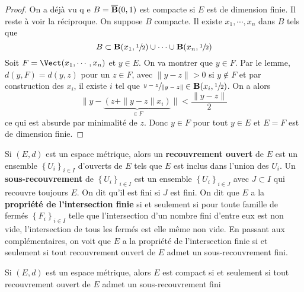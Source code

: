 \begin{proof}
    On a déjà vu q e $B= \overline{\mathbf B}(0, 1)$ est compacte si $E$ est de dimension finie. Il reste à voir la réciproque. On suppose $B$ compacte. Il existe $x_1, \cdots , x_n$ dans $B$ tels que \[
        B\subset \mathbf B(x_1, \sfrac12)\cup \cdots \cup \mathbf B(x_n, \sfrac 12)
    \] 
    Soit $F=\Vect(x_1, \cdots , x_n)$ et $y \in  E$. On va montrer que $y \in F$. Par le lemme, $d(y, F)=d(y, z)$ pour un  $z \in  F$, avec $\|y-z\|>0$ si $y \not \in F$ et par construction des $x_i$, il existe  $i$ tel que  $\sfrac{y-z}{\|y-z\|} \in  \mathbf B(x_i, \sfrac12)$. On a alors \[
        \|y-\underbrace{(z+ \|y-z\|x_i)}_{\in  F}\|< \frac{\|y-z\|}2
    \]
    ce qui est absurde par minimalité de $z$. Donc  $y \in  F$ pour tout $y \in  E$ et $E=F$ est de dimension finie.
\end{proof}

\begin{dfn}
    Si $(E, d)$ est un espace métrique, alors un \textbf{recouvrement ouvert}  de  $E$ est un ensemble  $\left\{ U_i \right\}_{i \in  I} $ d'ouverts de $E$ tels que  $E$ est inclus dans l'union  des $U_i$. Un \textbf{sous-recouvrement}  de $\left\{ U_i \right\} _{i \in I}$ est un ensemble $\left\{ U_i \right\} _{i \in  J}$ avec $J\subset I$ qui recouvre toujours  $E$. On dit qu'il est fini si  $J$ est fini. On dit que $E$ a la  \textbf{propriété de l'intersection finie} si et seulement si pour toute famille de fermés $\left\{ F_i \right\} _{i \in  I}$ telle que l'intersection d'un nombre fini d'entre eux est non vide, l'intersection de tous les fermés est elle même non vide. En passant aux complémentaires, on voit que $E$ a la propriété de l'intersection finie  si et seulement si tout recouvrement ouvert de $E$ admet un sous-recouvrement fini.
\end{dfn}

\begin{thm}
    Si $(E, d)$ est un espace métrique, alors  $E$ est compact  si et seulement si tout recouvrement ouvert de $E$ admet un sous-recouvrement fini
\end{thm}

